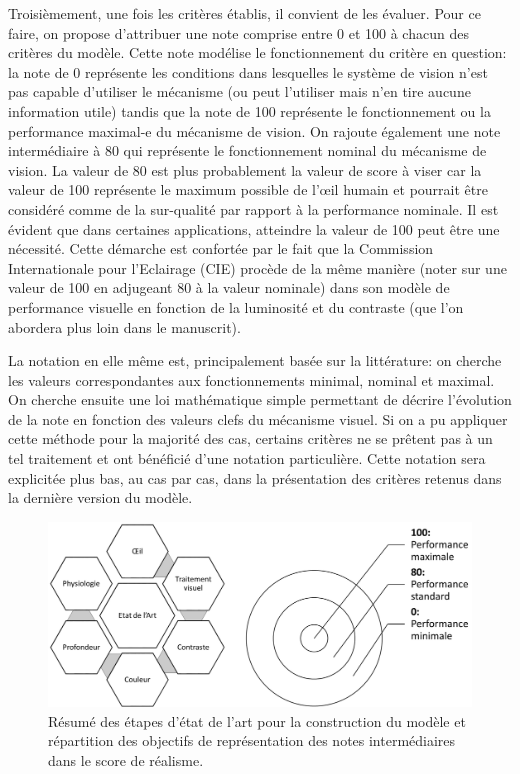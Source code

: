 	\par Troisièmement, une fois les critères établis, il convient de les évaluer. Pour ce faire, on propose d'attribuer une note comprise entre 0 et 100 à chacun des critères du modèle. Cette note modélise le fonctionnement du critère en question: la note de 0 représente les conditions dans lesquelles le système de vision n'est pas capable d'utiliser le mécanisme (ou peut l'utiliser mais n'en tire aucune information utile) tandis que la note de 100 représente le fonctionnement ou la performance maximal-e du mécanisme de vision. On rajoute également une note intermédiaire à 80 qui représente le fonctionnement nominal du mécanisme de vision. La valeur de 80 est plus probablement la valeur de score à viser car la valeur de 100 représente le maximum possible de l'œil humain et pourrait être considéré comme de la sur-qualité par rapport à la performance nominale. Il est évident que dans certaines applications, atteindre la valeur de 100 peut être une nécessité. Cette démarche est confortée par le fait que la Commission Internationale pour l'Eclairage (CIE) procède de la même manière (noter sur une valeur de 100 en adjugeant 80 à la valeur nominale) dans son modèle de performance visuelle en fonction de la luminosité et du contraste (que l'on abordera plus loin dans le manuscrit).
	
	\par La notation en elle même est, principalement basée sur la littérature: on cherche les valeurs correspondantes aux fonctionnements minimal, nominal et maximal. On cherche ensuite une loi mathématique simple permettant de décrire l'évolution de la note en fonction des valeurs clefs du mécanisme visuel. Si on a pu appliquer cette méthode pour la majorité des cas, certains critères ne se prêtent pas à un tel traitement et ont bénéficié d'une notation particulière. Cette notation sera explicitée plus bas, au cas par cas, dans la présentation des critères retenus dans la dernière version du modèle.
	
	\begin{figure}
		\centering
		\includegraphics[scale=.50]{Figures/EDLAProcessScoreTarget}
		\caption{Résumé des étapes d'état de l'art pour la construction du modèle et répartition des objectifs de représentation des notes intermédiaires dans le score de réalisme.}
		\label{fig:edla_process_score_target}
	\end{figure}
	
